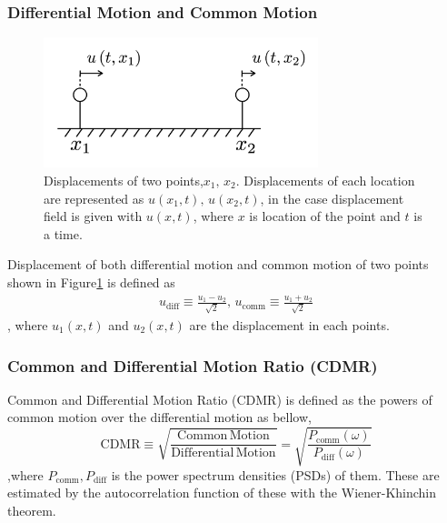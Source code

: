 \documentclass[a4paper,12pt]{book}
\begin{document}
\subsubsection{Differential Motion and Common Motion}
\begin{figure}[H]
  \begin{center}
    \includegraphics[width=8.0cm]{./img_cdmr_xarm.png}
  \end{center}
  \caption{Displacements of two points,$x_1,\,x_2$. Displacements of each location are represented as $u(x_1,t),\, u(x_2,t)$, in the case displacement field is given with $u(x,t)$, where $x$ is location of the point and $t$ is a time.
  }\label{img:img_diffcomm}  
\end{figure}


Displacement of both differential motion and common motion of two points shown in Figure\ref{img:img_diffcomm} is defined as
\begin{eqnarray}\label{eq:eq22}
  u_{\mathrm{diff}} \equiv \frac{u_{1}-u_{2}}{\sqrt{2}}, \,
  u_{\mathrm{comm}}  \equiv \frac{u_{1}+u_{2}}{\sqrt{2}}
\end{eqnarray}
, where $u_{1}(x,t)$ and $u_2(x,t)$ are the displacement in each points.

\subsubsection{Common and Differential Motion Ratio (CDMR)}
Common and Differential Motion Ratio (CDMR) is defined as the powers of common motion over the differential motion as bellow,
\begin{equation}
  \mathrm{CDMR} \equiv \sqrt{\frac{\mathrm{Common\,Motion}}{\mathrm{Differential\,Motion}}} = \sqrt{\frac{P_{\mathrm{comm}}(\omega)}{P_{\mathrm{diff}}(\omega)}} \label{eq:eq23}
\end{equation}
,where $P_{\mathrm{comm}},P_{\mathrm{diff}}$ is the power spectrum densities (PSDs) of them. These are estimated by the autocorrelation function of these with the Wiener-Khinchin theorem.
\end{document}
